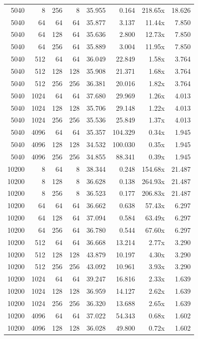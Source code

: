 {\begin{longtable}{rrrrrrrr}
5040 & 8 & 256 & 8 & 35.955 & 0.164 & 218.65x & 18.626\\
5040 & 64 & 64 & 64 & 35.877 & 3.137 & 11.44x & 7.850\\
5040 & 64 & 128 & 64 & 35.636 & 2.800 & 12.73x & 7.850\\
5040 & 64 & 256 & 64 & 35.889 & 3.004 & 11.95x & 7.850\\
5040 & 512 & 64 & 64 & 36.049 & 22.849 & 1.58x & 3.764\\
5040 & 512 & 128 & 128 & 35.908 & 21.371 & 1.68x & 3.764\\
5040 & 512 & 256 & 256 & 36.381 & 20.016 & 1.82x & 3.764\\
5040 & 1024 & 64 & 64 & 37.680 & 29.969 & 1.26x & 4.013\\
5040 & 1024 & 128 & 128 & 35.706 & 29.148 & 1.22x & 4.013\\
5040 & 1024 & 256 & 256 & 35.536 & 25.849 & 1.37x & 4.013\\
5040 & 4096 & 64 & 64 & 35.357 & 104.329 & 0.34x & 1.945\\
5040 & 4096 & 128 & 128 & 34.532 & 100.030 & 0.35x & 1.945\\
5040 & 4096 & 256 & 256 & 34.855 & 88.341 & 0.39x & 1.945\\
10200 & 8 & 64 & 8 & 38.344 & 0.248 & 154.68x & 21.487\\
10200 & 8 & 128 & 8 & 36.628 & 0.138 & 264.93x & 21.487\\
10200 & 8 & 256 & 8 & 36.523 & 0.177 & 206.83x & 21.487\\
10200 & 64 & 64 & 64 & 36.662 & 0.638 & 57.43x & 6.297\\
10200 & 64 & 128 & 64 & 37.094 & 0.584 & 63.49x & 6.297\\
10200 & 64 & 256 & 64 & 36.780 & 0.544 & 67.60x & 6.297\\
10200 & 512 & 64 & 64 & 36.668 & 13.214 & 2.77x & 3.290\\
10200 & 512 & 128 & 128 & 43.879 & 10.197 & 4.30x & 3.290\\
10200 & 512 & 256 & 256 & 43.092 & 10.961 & 3.93x & 3.290\\
10200 & 1024 & 64 & 64 & 39.247 & 16.816 & 2.33x & 1.639\\
10200 & 1024 & 128 & 128 & 36.959 & 14.127 & 2.62x & 1.639\\
10200 & 1024 & 256 & 256 & 36.320 & 13.688 & 2.65x & 1.639\\
10200 & 4096 & 64 & 64 & 37.022 & 54.343 & 0.68x & 1.602\\
10200 & 4096 & 128 & 128 & 36.028 & 49.800 & 0.72x & 1.602\\

\end{longtable}}
